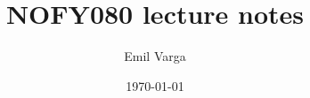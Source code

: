\documentclass{article}
\title{NOFY080 lecture notes}
\author{Emil Varga}
\date{\today}
\newcommand{\ls}[1]{\lstinline{#1}}
\begin{document}
\maketitle

\tableofcontents
\listofintermezzos
\lstlistoflistings













\newpage
\appendix

\end{document}
